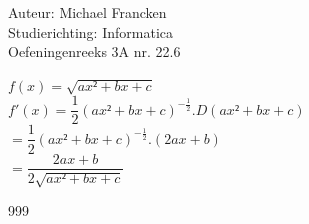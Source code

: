 \documentclass[a4paper]{article}
\begin{document}
\noindent \large Auteur: Michael Francken \\
\noindent \large Studierichting: Informatica\\
\noindent \large Oefeningenreeks 3A nr. 22.6\\

\medskip

\normalsize
$f(x)=\sqrt{ax²+bx+c}$\\

$f'(x)=\dfrac{1}{2}\left(ax²+bx+c\right)^{-\tfrac{1}{2}}.D\left(ax²+bx+c\right)$\\

$=\dfrac{1}{2}\left(ax²+bx+c\right)^{-\tfrac{1}{2}}.\left(2ax+b\right)$\\

$=\dfrac{2ax+b}{2\sqrt{ax²+bx+c}}$\\



\begin{thebibliography}{999}
\end{thebibliography}
\end{document}
